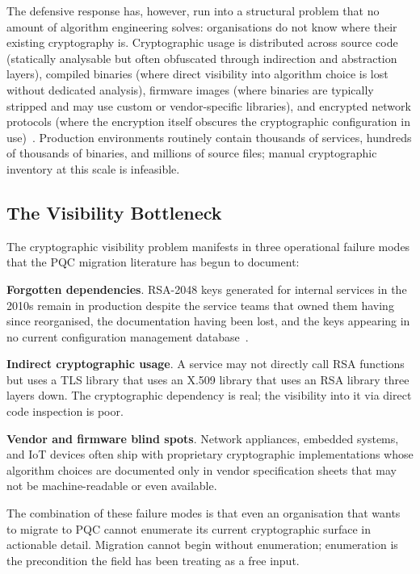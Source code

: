 \documentclass[sigconf,nonacm]{acmart}
\begin{document}
The defensive response has, however, run into a structural problem
that no amount of algorithm engineering solves: organisations do not
know where their existing cryptography is. Cryptographic usage is
distributed across source code (statically analysable but often
obfuscated through indirection and abstraction layers), compiled
binaries (where direct visibility into algorithm choice is lost
without dedicated analysis), firmware images (where binaries are
typically stripped and may use custom or vendor-specific libraries),
and encrypted network protocols (where the encryption itself
obscures the cryptographic configuration in
use)~\cite{nccoe2024cryptodisc,heron2024visibility}. Production
environments routinely contain thousands of services, hundreds of
thousands of binaries, and millions of source files; manual
cryptographic inventory at this scale is infeasible.

\subsection{The Visibility Bottleneck}

The cryptographic visibility problem manifests in three operational
failure modes that the PQC migration literature has begun to
document:

\textbf{Forgotten dependencies}. RSA-2048 keys generated for
internal services in the 2010s remain in production despite the
service teams that owned them having since reorganised, the
documentation having been lost, and the keys appearing in no
current configuration management
database~\cite{wisser2024forgotten}.

\textbf{Indirect cryptographic usage}. A service may not directly call
RSA functions but uses a TLS library that uses an X.509 library that
uses an RSA library three layers down. The cryptographic dependency
is real; the visibility into it via direct code inspection is poor.

\textbf{Vendor and firmware blind spots}. Network appliances,
embedded systems, and IoT devices often ship with proprietary
cryptographic implementations whose algorithm choices are
documented only in vendor specification sheets that may not be
machine-readable or even available.

The combination of these failure modes is that even an organisation
that wants to migrate to PQC cannot enumerate its current
cryptographic surface in actionable detail. Migration cannot begin
without enumeration; enumeration is the precondition the field has
been treating as a free input.
\end{document}
